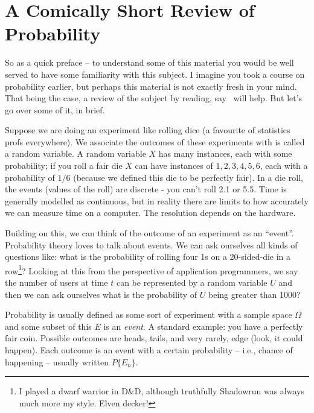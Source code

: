 




\section*{A Comically Short Review of Probability}

So as a quick preface -- to understand some of this material you would be well served to have some familiarity with this subject. I imagine you took a course on probability earlier, but perhaps this material is not exactly fresh in your mind. That being the case, a review of the subject by reading, say~\cite{swps,pmd} will help. But let's go over some of it, in brief. 

Suppose we are doing an experiment like rolling dice (a favourite of statistics profs everywhere). We associate the outcomes of these experiments with is called a random variable. A random variable $X$ has many instances, each with some probability; if you roll a fair die $X$ can have instances of ${1, 2, 3, 4, 5, 6}$, each with a probability of $1/6$ (because we defined this die to be perfectly fair). In a die roll, the events (values of the roll) are discrete - you can't roll 2.1 or 5.5. Time is generally modelled as continuous, but in reality there are limits to how accurately we can measure time on a computer. The resolution depends on the hardware. 

Building on this, we can think of the outcome of an experiment as an ``event''. Probability theory loves to talk about events. We can ask ourselves all kinds of questions like: what is the probability of rolling four 1s on a 20-sided-die in a row\footnote{I played a dwarf warrior in D\&D, although truthfully Shadowrun was always much more my style. Elven decker!}? Looking at this from the perspective of application programmers, we say the number of users at time $t$ can be represented by a random variable $U$ and then we can ask ourselves what is the probability of $U$ being greater than 1000?

Probability is usually defined as some sort of experiment with a sample space $\Omega$ and some subset of this $E$ is an \textit{event}. A standard example: you have a perfectly fair coin. Possible outcomes are heads, tails, and very rarely, edge (look, it could happen). Each outcome is an event with a certain probability -- i.e., chance of happening -- usually written $P\{E_{n}\}$.

